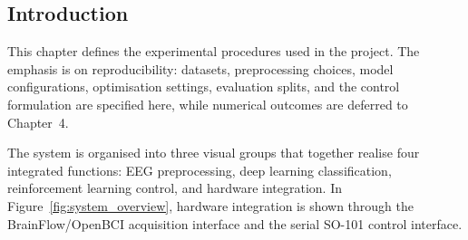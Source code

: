 \documentclass[12pt, a4paper]{article}
\begin{document}
\subsection{Introduction}

This chapter defines the experimental procedures used in the project. The emphasis is on reproducibility: datasets, preprocessing choices, model configurations, optimisation settings, evaluation splits, and the control formulation are specified here, while numerical outcomes are deferred to Chapter~4.

The system is organised into three visual groups that together realise four integrated functions: EEG preprocessing, deep learning classification, reinforcement learning control, and hardware integration. In Figure~\ref{fig:system_overview}, hardware integration is shown through the BrainFlow/OpenBCI acquisition interface and the serial SO-101 control interface.
\end{document}
